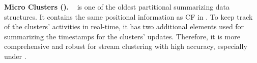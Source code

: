
 

\textbf{Micro Clusters (\MCs).} 
\label{subsec:MCs}
\MCs~\cite{Clustream:03} is one of the oldest partitional summarizing data structures. It contains the same positional information as CF in \CFT. To keep track of the clusters' activities in real-time, it has two additional elements used for summarizing the timestamps for the clusters' updates. Therefore, it is more comprehensive and robust for stream clustering with high accuracy, especially under \cef.

